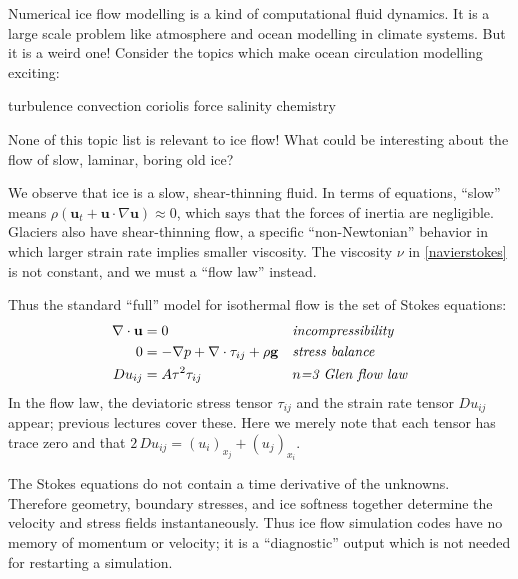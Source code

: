 \documentclass[titlepage,letterpaper,final,12pt]{scrartcl}
\begin{document}
Numerical ice flow modelling is a kind of computational fluid dynamics.  It is a large scale  problem like atmosphere and ocean modelling in climate systems.  But it is a weird one!  Consider the topics which make ocean circulation modelling exciting:
  \begin{center} turbulence \qquad convection \qquad  coriolis force  \qquad salinity \qquad chemistry
  \end{center}
None of this topic list is relevant to ice flow!  What could be interesting about the flow of slow, laminar, boring old ice?

We observe that ice is a slow, shear-thinning fluid.  In terms of equations, ``slow'' means $\rho \left(\mathbf{u}_t + \mathbf{u}\cdot\nabla \mathbf{u}\right) \approx 0$, which says that the forces of inertia are negligible.  Glaciers also have shear-thinning flow, a specific ``non-Newtonian'' behavior in which larger strain rate implies smaller viscosity.  The viscosity $\nu$ in \eqref{navierstokes} is not constant, and we must a ``flow law'' instead.

Thus the standard ``full'' model for isothermal flow is the set of Stokes equations:
\begin{align}
\nabla \cdot \mathbf{u} &= 0 &&\text{\emph{incompressibility}} \label{incompressibleagain} \\
0 &= - \nabla p + \nabla \cdot \tau_{ij} + \rho \mathbf{g} &&\text{\emph{stress balance}} \label{forcebalance} \\
Du_{ij} &= A \tau^2 \tau_{ij} &&\text{\emph{$n$=3 Glen flow law}} \label{flowlaw}
\end{align}
In the flow law, the deviatoric stress tensor $\tau_{ij}$ and the strain rate tensor $Du_{ij}$ appear; previous lectures cover these.  Here we merely note that each tensor has trace zero and that $2\,Du_{ij} = (u_i)_{x_j}+(u_j)_{x_i}$.

The Stokes equations do not contain a time derivative of the unknowns.  Therefore geometry, boundary stresses, and ice softness together determine the velocity and stress fields instantaneously.  Thus ice flow simulation codes have no memory of momentum or velocity; it is a ``diagnostic'' output which is not needed for restarting a simulation.
\end{document}
